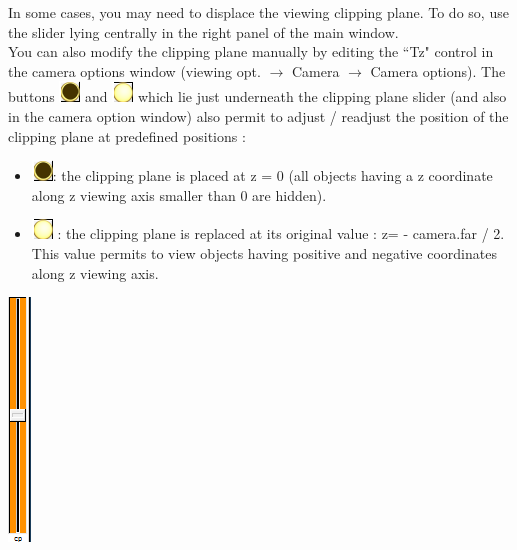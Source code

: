 \begin{minipage}{0.7\textwidth}
In some cases, you may need to displace the viewing clipping plane. To do so, use
the slider lying centrally in the right panel of the main window.\\
You can also modify the clipping plane manually by editing the ``Tz" control in
the camera options window (viewing opt. $\rightarrow$ Camera $\rightarrow$ Camera options).
The buttons \includegraphics[scale=0.7]{images/Icons/clipping_plane3.png} and \includegraphics[scale=0.7]{images/Icons/clipping_plane2.png} which lie just underneath the clipping plane slider (and
also in the camera option window) also permit to adjust / readjust the position of
the clipping plane at predefined positions :
\begin{itemize}
\item  \includegraphics[scale=0.7]{images/Icons/clipping_plane3.png}: the clipping plane is placed at z = 0 (all objects having a z coordinate along
z viewing axis smaller than 0 are hidden).
\item	\includegraphics[scale=0.7]{images/Icons/clipping_plane2.png} : the clipping plane is replaced at its original value : z= - camera.far / 2. This value permits to
view objects having positive and negative coordinates along z viewing axis.

\end{itemize}
\end{minipage}    
\begin{minipage}{0.25\textwidth}\centering
  \includegraphics[scale=0.5]{images/Icons/clipping_plane.png}
 \end{minipage}   




